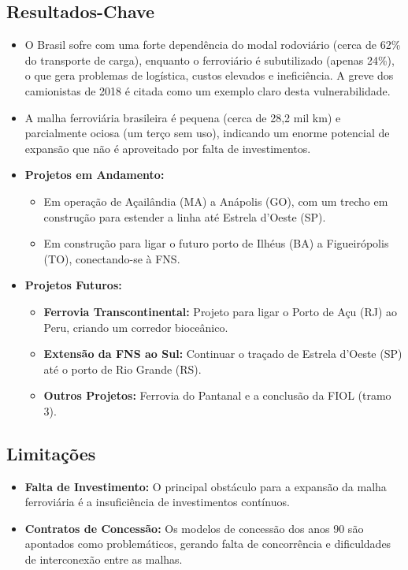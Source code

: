 \documentclass[12pt]{article}
\begin{document}
\subsection*{Resultados-Chave}
\begin{itemize}
    \item  O Brasil sofre com uma forte dependência do modal rodoviário (cerca de 62\% do transporte de carga), enquanto o ferroviário é subutilizado (apenas 24\%), o que gera problemas de logística, custos elevados e ineficiência. A greve dos camionistas de 2018 é citada como um exemplo claro desta vulnerabilidade.
    \item  A malha ferroviária brasileira é pequena (cerca de 28,2 mil km) e parcialmente ociosa (um terço sem uso), indicando um enorme potencial de expansão que não é aproveitado por falta de investimentos.
    \item \textbf{Projetos em Andamento:}
    \begin{itemize}
        \item  Em operação de Açailândia (MA) a Anápolis (GO), com um trecho em construção para estender a linha até Estrela d'Oeste (SP).
        \item  Em construção para ligar o futuro porto de Ilhéus (BA) a Figueirópolis (TO), conectando-se à FNS.
    \end{itemize}
    \item \textbf{Projetos Futuros:}
    \begin{itemize}
        \item \textbf{Ferrovia Transcontinental:} Projeto para ligar o Porto de Açu (RJ) ao Peru, criando um corredor bioceânico.
        \item \textbf{Extensão da FNS ao Sul:} Continuar o traçado de Estrela d'Oeste (SP) até o porto de Rio Grande (RS).
        \item \textbf{Outros Projetos:} Ferrovia do Pantanal e a conclusão da FIOL (tramo 3).
    \end{itemize}
\end{itemize}

\subsection*{Limitações}
\begin{itemize}
    \item \textbf{Falta de Investimento:} O principal obstáculo para a expansão da malha ferroviária é a insuficiência de investimentos contínuos.
    \item \textbf{Contratos de Concessão:} Os modelos de concessão dos anos 90 são apontados como problemáticos, gerando falta de concorrência e dificuldades de interconexão entre as malhas.
\end{itemize}
\end{document}
